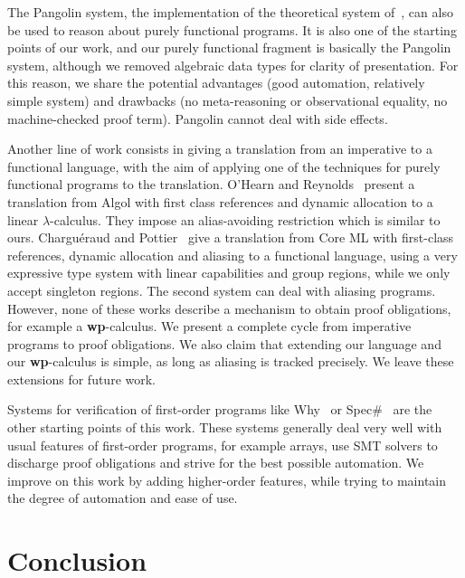 \documentclass[a4paper]{llncs}
\newcommand{\wpre}{{\bf wp}}
\begin{document}
The Pangolin system, the implementation of the theoretical system
of~\cite{regis-gianas-pottier-08}, can also be used to reason about
purely functional programs. It is also one of the starting points of
our work, and our purely functional fragment is basically the Pangolin
system, although we removed algebraic data types for clarity of
presentation. For this reason, we share the potential advantages (good
automation, relatively simple system) and drawbacks (no
meta-reasoning or observational equality, no machine-checked proof
term). Pangolin cannot deal with side effects.

Another line of work consists in giving a translation from an imperative to a
functional language, with the aim of applying one of the techniques for purely
functional programs to the translation. O'Hearn and
Reynolds~\cite{ohearn-reynolds-00} present a translation from Algol with first
class references and dynamic allocation to a linear $\lambda$-calculus. They
impose an alias-avoiding restriction which is similar to ours. Charguéraud and
Pottier~\cite{chargueraud-pottier-08} give a translation from Core ML with
first-class references, dynamic allocation and aliasing to a functional
language, using a very expressive type system with linear capabilities and
group regions, while we only accept singleton regions. The second system can
deal with aliasing programs. However, none of these works describe a mechanism
to obtain proof obligations, for example a \wpre-calculus.  We present a
complete cycle from imperative programs to proof obligations. We also claim
that extending our language and our \wpre-calculus is simple, as long as
aliasing is tracked precisely.  We leave these extensions for future work.

Systems for verification of first-order programs like
Why~\cite{Filliatre00a,filliatre07cav} or Spec\#~\cite{BarnettLS04} are the
other starting points of this work. These systems generally deal very well
with usual features of first-order programs, for example arrays, use SMT
solvers to discharge proof obligations and strive for the best possible
automation. We improve on this work by adding higher-order features,
while trying to maintain the degree of automation and ease of use.

\section{Conclusion}
\label{sec:conclusion}
\end{document}
